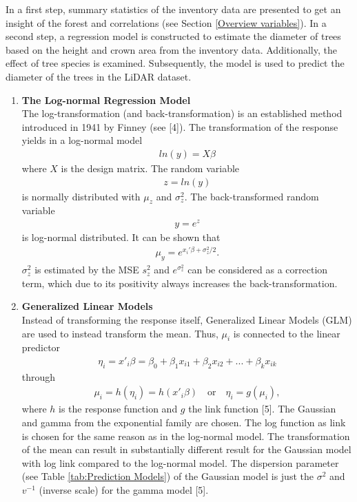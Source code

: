 
In a first step, summary statistics of the inventory data are presented to get an insight of the forest and
correlations (see Section \ref{Overview variables}).
In a second step, a regression model is constructed to estimate the diameter of trees based on the height and
crown area from the inventory data. Additionally, the effect of tree species is examined. Subsequently, the
model is used to predict the diameter of the trees in the LiDAR dataset.

\renewcommand{\labelenumi}{\arabic{enumi}.}
\begin{enumerate}

\item \textbf{The Log-normal Regression Model} \\
The log-transformation (and back-transformation) is an established method introduced in 1941 by Finney (see [4]).
The transformation of the response yields in a log-normal model 
\begin{align*}
ln(y)  =  X\beta
\end{align*}
 where $X$ is the design matrix. The
random variable 
\begin{align*}
z = ln(y)
\end{align*}
 is normally distributed with $\mu_z$ and $\sigma_z^2$. 
The back-transformed random variable 
\begin{align*}
y = e^z
\end{align*}
 is log-normal
distributed. It can be shown that 
\begin{align*}
\mu_y = e^{x_i' \beta+\sigma_z^2/2}.
\end{align*}
$\sigma_z^2$ is estimated by the MSE $s_z^2$ and $e^{\sigma_z^2}$ can be considered as a correction term, which
due to its positivity always increases the back-transformation.

\item \textbf{Generalized Linear Models} \\
Instead of transforming the response itself, Generalized Linear Models (GLM) are used to instead transform the
mean. Thus, $\mu_i$ is connected to the linear predictor
\begin{align*}
\eta_i = x'_i\beta = \beta_0 + \beta_1 x_{i1} + \beta_2 x_{i2} + ... + \beta_k x_{ik}
\end{align*}
 through 
\begin{align*}
\mu_i = h(\eta_i) = h(x'_i \beta) \quad \text{or} \quad \eta_i = g(\mu_i),
\end{align*} 
  where $h$ is the response function and $g$ the link
function [5]. The Gaussian and gamma from the exponential family are chosen. The log function
as link is chosen for the same reason as in the log-normal model. The transformation of the mean can result in
substantially different result for the Gaussian model with log link compared to the log-normal model.
The dispersion parameter 	 (see Table \ref{tab:Prediction Models}) of the Gaussian model is just the $\sigma^2$ and $v^{-1}$ (inverse scale) for the gamma
model [5].

\end{enumerate}


